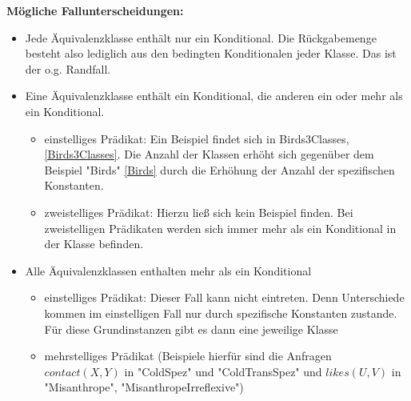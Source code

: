 \documentclass[a4paper, 11pt]{book}
\begin{document}
\textbf{Mögliche Fallunterscheidungen:}
\begin{itemize}
	\item Jede Äquivalenzklasse enthält nur ein Konditional. Die Rückgabemenge besteht also lediglich aus den bedingten Konditionalen jeder Klasse. Das ist der o.g. Randfall.
	\item Eine Äquivalenzklasse enthält ein Konditional, die anderen ein oder mehr als ein Konditional. 
	\begin{itemize}
		\item einstelliges Prädikat: Ein Beispiel findet sich in Birds3Classes, \ref{Birds3Classes}. Die Anzahl der Klassen erhöht sich gegenüber dem Beispiel "{}Birds"{} \ref{Birds} durch die Erhöhung der Anzahl der spezifischen Konstanten.\\
		\item zweistelliges Prädikat: Hierzu ließ sich kein Beispiel finden. Bei zweistelligen Prädikaten werden sich immer mehr als ein Konditional in der Klasse befinden.
	\end{itemize}
	\item Alle Äquivalenzklassen enthalten mehr als ein Konditional
	\begin{itemize}
		\item einstelliges Prädikat: Dieser Fall kann nicht eintreten. Denn Unterschiede kommen im einstelligen Fall nur durch spezifische Konstanten zustande. Für diese Grundinstanzen gibt es dann eine jeweilige Klasse\\
		\item mehrstelliges Prädikat (Beispiele hierfür sind die Anfragen $ contact(X,Y) $ in "{}ColdSpez"{} und "{}ColdTransSpez"{} und $ likes(U,V) $ in "{}Misanthrope"{}, "{}MisanthropeIrreflexive"{}) \\
	\end{itemize}
\end{itemize}
\end{document}
